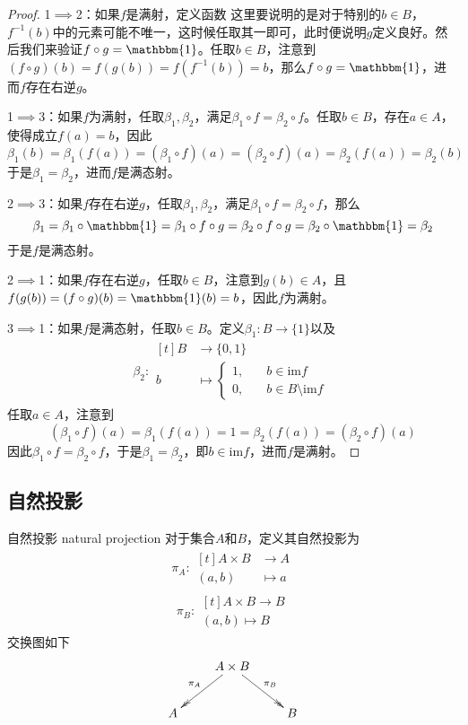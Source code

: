 \begin{proof}
	1$\implies$2：如果$f$是满射，定义函数
	这里要说明的是对于特别的$b\in B$，$f^{-1}(b)$中的元素可能不唯一，这时候任取其一即可，此时便说明$g$定义良好。然后我们来验证$f\circ g=\mathbbm{1}$。任取$b\in B$，注意到$(f\circ g)(b)=f(g(b))=f(f^{-1}(b))=b$，那么$f\circ g=\mathbbm{1}$，进而$f$存在右逆$g$。
	
	1$\implies$3：如果$f$为满射，任取$\beta_1,\beta_2$，满足$\beta_1\circ f=\beta_2\circ f$。任取$b\in B$，存在$a\in A$，使得成立$f(a)=b$，因此
	$$
	\beta_1(b)=\beta_1(f(a))=(\beta_1\circ f)(a)=(\beta_2\circ f)(a)=\beta_2(f(a))=\beta_2(b)
	$$
	于是$\beta_1=\beta_2$，进而$f$是满态射。
	
	2$\implies $3：如果$f$存在右逆$g$，任取$\beta_1,\beta_2$，满足$\beta_1\circ f=\beta_2\circ f$，那么
	$$
	\beta_1=\beta_1\circ \mathbbm{1}=\beta_1\circ f\circ g=\beta_2\circ f\circ g=\beta_2\circ \mathbbm{1}=\beta_2
	$$
	于是$f$是满态射。
	
	2$\implies$1：如果$f$存在右逆$g$，任取$b\in B$，注意到$g(b)\in A$，且$f(g(b))=(f\circ g)(b)=\mathbbm{1}(b)=b$，因此$f$为满射。
	
	3$\implies$1：如果$f$是满态射，任取$b\in B$。定义$\beta_1:B\to\{1\}$以及
	\begin{align*}
		\beta_2: \begin{aligned}[t]
			B &\longrightarrow \{0,1\}\\
			b &\longmapsto \begin{cases}
				1,\quad & b\in\mathrm{im}f\\
				0,\quad & b\in B\setminus\mathrm{im}f
			\end{cases}
		\end{aligned}
	\end{align*}
	任取$a\in A$，注意到
	$$
	(\beta_1\circ f)(a)=\beta_1(f(a))=1=\beta_2(f(a))=(\beta_2\circ f)(a)
	$$
	因此$\beta_1\circ f=\beta_2\circ f$，于是$\beta_1=\beta_2$，即$b\in\mathrm{im}f$，进而$f$是满射。
\end{proof}

\subsection{自然投影}

\begin{definition}{自然投影 natural projection}
	对于集合$A$和$B$，定义其自然投影为
	\begin{align*}
		\pi_A: \begin{aligned}[t]
			A\times B&\longrightarrow A\\
			(a,b)&\longmapsto a
		\end{aligned}
	\end{align*}
	\begin{align*}
		\pi_B: \begin{aligned}[t]
			A\times B\longrightarrow B\\
			(a,b)\longmapsto B
		\end{aligned}
	\end{align*}
	交换图如下
	$$
	\xymatrix{
		& A\times B\ar@{^{}->>}[ld]_{\pi_A} \ar@{->>}[rd]^{\pi_B} &\\
		A &           & B
	}
	$$
\end{definition}

